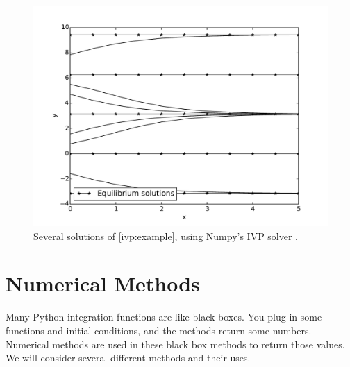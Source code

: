 \begin{figure}
\centering
\includegraphics[width=\textwidth]{example2.pdf}
\caption{Several solutions of \eqref{ivp:example}, using Numpy's IVP solver . }
\label{ivp:int_curves}
\end{figure}


\section*{Numerical Methods}
Many Python integration functions are like black boxes.
You plug in some functions and initial conditions, and the methods return some numbers.
Numerical methods are used in these black box methods to return those values.
We will consider several different methods and their uses.

